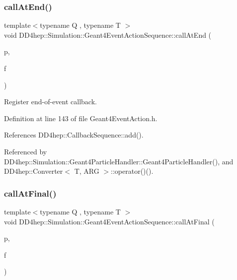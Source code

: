 \subsubsection{\texorpdfstring{call\+At\+End()}{callAtEnd()}}
{\footnotesize\ttfamily template$<$typename Q , typename T $>$ \\
void D\+D4hep\+::\+Simulation\+::\+Geant4\+Event\+Action\+Sequence\+::call\+At\+End (\begin{DoxyParamCaption}\item[{Q $\ast$}]{p,  }\item[{void(T\+::$\ast$)(const G4\+Event $\ast$)}]{f }\end{DoxyParamCaption})\hspace{0.3cm}{\ttfamily [inline]}}



Register end-\/of-\/event callback. 



Definition at line 143 of file Geant4\+Event\+Action.\+h.



References D\+D4hep\+::\+Callback\+Sequence\+::add().



Referenced by D\+D4hep\+::\+Simulation\+::\+Geant4\+Particle\+Handler\+::\+Geant4\+Particle\+Handler(), and D\+D4hep\+::\+Converter$<$ T, A\+R\+G $>$\+::operator()().

\hypertarget{class_d_d4hep_1_1_simulation_1_1_geant4_event_action_sequence_afeb7603fa772b6a776fafd81dc287171}{}\label{class_d_d4hep_1_1_simulation_1_1_geant4_event_action_sequence_afeb7603fa772b6a776fafd81dc287171} 
\subsubsection{\texorpdfstring{call\+At\+Final()}{callAtFinal()}}
{\footnotesize\ttfamily template$<$typename Q , typename T $>$ \\
void D\+D4hep\+::\+Simulation\+::\+Geant4\+Event\+Action\+Sequence\+::call\+At\+Final (\begin{DoxyParamCaption}\item[{Q $\ast$}]{p,  }\item[{void(T\+::$\ast$)(const G4\+Event $\ast$)}]{f }\end{DoxyParamCaption})\hspace{0.3cm}{\ttfamily [inline]}}



